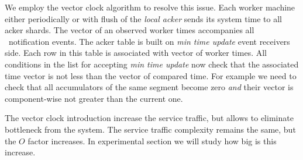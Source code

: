 We employ the vector clock algorithm to resolve this issue. Each worker machine either periodically or with flush of the \textit{local acker} sends its system time to all acker shards. The vector of an observed worker times accompanies all \tracker\ notification events. The acker table is built on \textit{min time update} event receivers side. Each row in this table is associated with vector of worker times. All conditions in the list for accepting \textit{min time update} now check that the associated time vector is not less than the vector of compared time. For example we need to check that all accumulators of the same segment become zero \textit{and} their vector is component-wise not greater than the current one.

The vector clock introduction increase the service traffic, but allows to eliminate bottleneck from the system. The service traffic complexity remains the same, but the $O$ factor increases. In experimental section we will study how big is this increase.


